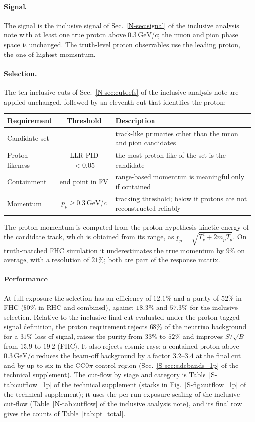 \documentclass[11pt,a4paper]{article}
\newcommand{\GeVc}{\,\text{GeV}\!/c}
\newcommand{\suppref}[2]{#1~\ref{S-#2} of the technical supplement}
\newcommand{\noteref}[2]{#1~\ref{N-#2} of the inclusive analysis note}
\begin{document}
\paragraph{Signal.} The signal is the inclusive signal of \noteref{Sec.}{sec:signal} with at least
one true proton above $0.3\GeVc$; the muon and pion phase space is unchanged. The truth-level
proton observables use the leading proton, the one of highest momentum.

\paragraph{Selection.} The ten inclusive cuts of \noteref{Sec.}{sec:cutdefs} are applied unchanged,
followed by an eleventh cut that identifies the proton:
\begin{center}\small
\begin{tabular}{lcp{8.6cm}}
\toprule
Requirement & Threshold & Description \\
\midrule
Candidate set & -- & track-like primaries other than the muon and pion candidates \\
Proton likeness & LLR PID $<0.05$ & the most proton-like of the set is the candidate \\
Containment & end point in FV & range-based momentum is meaningful only if contained \\
Momentum & $p_p\ge0.3\GeVc$ & tracking threshold; below it protons are not reconstructed reliably \\
\bottomrule
\end{tabular}
\end{center}
\noindent The proton momentum is computed from the proton-hypothesis kinetic energy of the candidate
track, which is obtained from its range, as $p_p=\sqrt{T_p^2+2m_pT_p}$. On truth-matched FHC
simulation it underestimates the true momentum by $9\%$ on average, with a resolution of $21\%$;
both are part of the response matrix.

\paragraph{Performance.} At full exposure the selection has an efficiency of $12.1\%$ and a purity of
$52\%$ in FHC ($50\%$ in RHC and combined), against $18.3\%$ and $57.3\%$ for the inclusive
selection. Relative to the inclusive final cut evaluated under the proton-tagged signal definition,
the proton requirement rejects $68\%$ of the neutrino background for a $31\%$ loss of signal,
raises the purity from $33\%$ to $52\%$ and improves $S/\sqrt{B}$ from $15.9$ to $19.2$ (FHC). It
also rejects cosmic rays: a contained proton above $0.3\GeVc$ reduces the beam-off background by a
factor $3.2$--$3.4$ at the final cut and by up to six in the CC$0\pi$ control region
(\suppref{Sec.}{sec:sidebands_1p}). The cut-flow by stage and category is
\suppref{Table}{tab:cutflow_1p} (stacks in \suppref{Fig.}{fig:cutflow_1p}); it uses the per-run
exposure scaling of the inclusive cut-flow (\noteref{Table}{tab:cutflow}), and its final row gives
the counts of Table~\ref{tab:pt_total}.
\end{document}
